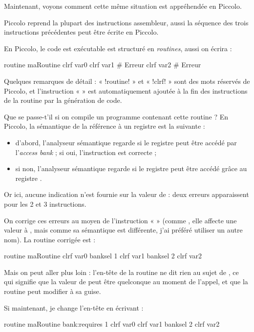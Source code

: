 Maintenant, voyons comment cette même situation est appréhendée en Piccolo.

Piccolo reprend la plupart des instructions assembleur, aussi la séquence des trois instructions précédentes peut être écrite en Piccolo.

En Piccolo, le code est exécutable est structuré en \emph{routines}, aussi on écrira :
\begin{piccolo}
routine maRoutine {
  clrf  var0
  clrf  var1  # Erreur
  clrf  var2  # Erreur
}
\end{piccolo}

Quelques remarques de détail : « \pic!routine! » et « \pic!clrf! » sont des mots réservés de Piccolo, et l’instruction «  » est automatiquement ajoutée à la fin des instructions de la routine par la génération de code.

Que se passe-t'il si on compile un programme contenant cette routine ? En Piccolo, la sémantique de la référence à un registre est la suivante :\begin{itemize}
\item d'abord, l'analyseur sémantique regarde si le registre peut être accédé par l'\emph{access bank} ; si oui, l'instruction est correcte ;
\item si non, l'analyseur sémantique regarde si le registre peut être accédé grâce au registre .
\end{itemize}

Or ici, aucune indication n'est fournie sur la valeur de  : deux erreurs apparaissent pour les 2 et 3 instructions.

On corrige ces erreurs au moyen de l’instruction «  » (comme , elle affecte une valeur à , mais comme sa sémantique est différente, j’ai préféré utiliser un autre nom). La routine corrigée est :
\begin{piccolo}
routine maRoutine {
  clrf  var0
  banksel 1
  clrf  var1
  banksel 2
  clrf  var2
}
\end{piccolo}


Mais on peut aller plus loin : l’en-tête de la routine ne dit rien au sujet de , ce qui signifie que la valeur de  peut être quelconque au moment de l’appel, et que la routine peut modifier  à sa guise.

Si maintenant, je change l’en-tête en écrivant :
\begin{piccolo}
routine maRoutine bank:requires 1 {
  clrf  var0
  clrf  var1
  banksel 2
  clrf  var2
}
\end{piccolo}

